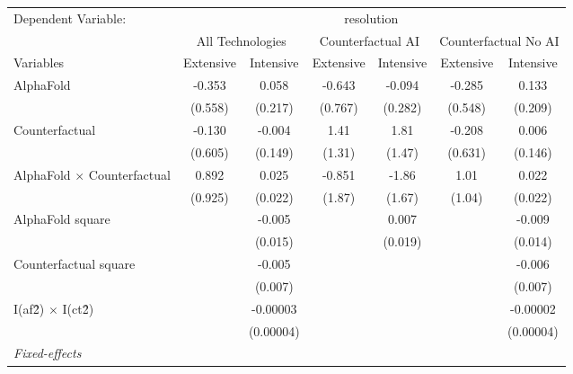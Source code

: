 \begingroup
\centering
\begin{tabular}{lcccccc}
   \tabularnewline \midrule \midrule
   Dependent Variable: & \multicolumn{6}{c}{resolution}\\
 & \multicolumn{2}{c}{All Technologies} & \multicolumn{2}{c}{Counterfactual AI} & \multicolumn{2}{c}{Counterfactual No AI} \\
\cmidrule(lr){1-1}\cmidrule(lr){2-3} \cmidrule(lr){4-5} \cmidrule(lr){6-7}
Variables & \multicolumn{1}{c}{Extensive} & \multicolumn{1}{c}{Intensive} & \multicolumn{1}{c}{Extensive} & \multicolumn{1}{c}{Intensive} & \multicolumn{1}{c}{Extensive} & \multicolumn{1}{c}{Intensive} \\
\cmidrule(lr){1-1}\cmidrule(lr){2-2} \cmidrule(lr){3-3} \cmidrule(lr){4-4} \cmidrule(lr){5-5} \cmidrule(lr){6-6} \cmidrule(lr){7-7}
   AlphaFold                          & -0.353  & 0.058     & -0.643  & -0.094  & -0.285  & 0.133\\   
                                      & (0.558) & (0.217)   & (0.767) & (0.282) & (0.548) & (0.209)\\   
   Counterfactual                     & -0.130  & -0.004    & 1.41    & 1.81    & -0.208  & 0.006\\   
                                      & (0.605) & (0.149)   & (1.31)  & (1.47)  & (0.631) & (0.146)\\   
   AlphaFold $\times$ Counterfactual  & 0.892   & 0.025     & -0.851  & -1.86   & 1.01    & 0.022\\   
                                      & (0.925) & (0.022)   & (1.87)  & (1.67)  & (1.04)  & (0.022)\\   
   AlphaFold square                   &         & -0.005    &         & 0.007   &         & -0.009\\   
                                      &         & (0.015)   &         & (0.019) &         & (0.014)\\   
   Counterfactual square              &         & -0.005    &         &         &         & -0.006\\   
                                      &         & (0.007)   &         &         &         & (0.007)\\   
   I(af\^2) $\times$ I(ct\^2)         &         & -0.00003  &         &         &         & -0.00002\\   
                                      &         & (0.00004) &         &         &         & (0.00004)\\   
   \midrule
   \emph{Fixed-effects}\\

\end{tabular}
